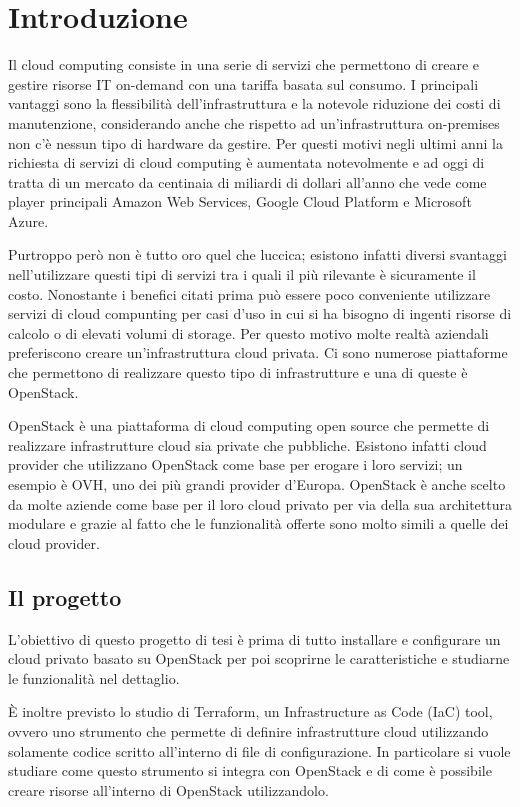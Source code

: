 \chapter{Introduzione}

Il cloud computing consiste in una serie di servizi che permettono di creare e gestire risorse IT on-demand con una tariffa basata sul consumo. I principali vantaggi sono la flessibilità dell'infrastruttura e la notevole riduzione dei costi di manutenzione, considerando anche che rispetto ad un'infrastruttura on-premises non c'è nessun tipo di hardware da gestire. Per questi motivi negli ultimi anni la richiesta di servizi di cloud computing è aumentata notevolmente e ad oggi di tratta di un mercato da centinaia di miliardi di dollari all'anno che vede come player principali Amazon Web Services, Google Cloud Platform e Microsoft Azure.

Purtroppo però non è tutto oro quel che luccica; esistono infatti diversi svantaggi nell'utilizzare questi tipi di servizi tra i quali il più rilevante è sicuramente il costo. Nonostante i benefici citati prima può essere poco conveniente utilizzare servizi di cloud compunting per casi d'uso in cui si ha bisogno di ingenti risorse di calcolo o di elevati volumi di storage. Per questo motivo molte realtà aziendali preferiscono creare un'infrastruttura cloud privata. Ci sono numerose piattaforme che permettono di realizzare questo tipo di infrastrutture e una di queste è OpenStack.

OpenStack è una piattaforma di cloud computing open source che permette di realizzare infrastrutture cloud sia private che pubbliche. Esistono infatti cloud provider che utilizzano OpenStack come base per erogare i loro servizi; un esempio è OVH, uno dei più grandi provider d'Europa.
OpenStack è anche scelto da molte aziende come base per il loro cloud privato per via della sua architettura modulare e grazie al fatto che le funzionalità offerte sono molto simili a quelle dei cloud provider.

\section{Il progetto}

L'obiettivo di questo progetto di tesi è prima di tutto installare e configurare un cloud privato basato su OpenStack per poi scoprirne le caratteristiche e studiarne le funzionalità nel dettaglio.

È inoltre previsto lo studio di Terraform, un Infrastructure as Code (IaC) tool, ovvero uno strumento che permette di definire infrastrutture cloud utilizzando solamente codice scritto all'interno di file di configurazione. In particolare si vuole studiare come questo strumento si integra con OpenStack e di come è possibile creare risorse all'interno di OpenStack utilizzandolo.

